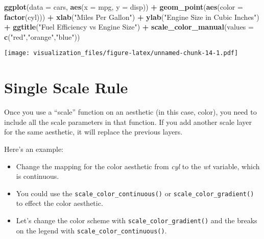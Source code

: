 \documentclass[oneside]{memoir}
\newenvironment{Shaded}{\begin{snugshade}}{\end{snugshade}}
\newcommand{\KeywordTok}[1]{\textcolor[rgb]{0.13,0.29,0.53}{\textbf{#1}}}
\newcommand{\DataTypeTok}[1]{\textcolor[rgb]{0.13,0.29,0.53}{#1}}
\newcommand{\StringTok}[1]{\textcolor[rgb]{0.31,0.60,0.02}{#1}}
\newcommand{\OperatorTok}[1]{\textcolor[rgb]{0.81,0.36,0.00}{\textbf{#1}}}
\newcommand{\NormalTok}[1]{#1}
\theoremstyle{definition}
\theoremstyle{definition}
\theoremstyle{definition}
\theoremstyle{remark}
\begin{document}
\begin{Shaded}
\begin{Highlighting}[]
\KeywordTok{ggplot}\NormalTok{(}\DataTypeTok{data =}\NormalTok{ cars, }\KeywordTok{aes}\NormalTok{(}\DataTypeTok{x =}\NormalTok{ mpg, }\DataTypeTok{y =}\NormalTok{ disp)) }\OperatorTok{+}
\StringTok{  }\KeywordTok{geom_point}\NormalTok{(}\KeywordTok{aes}\NormalTok{(}\DataTypeTok{color =} \KeywordTok{factor}\NormalTok{(cyl))) }\OperatorTok{+}
\StringTok{  }\KeywordTok{xlab}\NormalTok{(}\StringTok{"Miles Per Gallon"}\NormalTok{) }\OperatorTok{+}
\StringTok{  }\KeywordTok{ylab}\NormalTok{(}\StringTok{"Engine Size in Cubic Inches"}\NormalTok{) }\OperatorTok{+}
\StringTok{  }\KeywordTok{ggtitle}\NormalTok{(}\StringTok{"Fuel Efficiency vs Engine Size"}\NormalTok{) }\OperatorTok{+}
\StringTok{  }\KeywordTok{scale_color_manual}\NormalTok{(}\DataTypeTok{values =} \KeywordTok{c}\NormalTok{(}\StringTok{"red"}\NormalTok{,}\StringTok{"orange"}\NormalTok{,}\StringTok{"blue"}\NormalTok{))}
\end{Highlighting}
\end{Shaded}

\texttt{[image: visualization\_files/figure-latex/unnamed-chunk-14-1.pdf]}

\section{Single Scale Rule}\label{single-scale-rule}

Once you use a ``scale'' function on an aesthetic (in this case, color),
you need to include all the scale parameters in that function. If you
add another scale layer for the same aesthetic, it will replace the
previous layers.

Here's an example:

\begin{itemize}
\item
  Change the mapping for the color aesthetic from \emph{cyl} to the
  \emph{wt} variable, which is continuous.
\item
  You could use the \texttt{scale\_color\_continuous()} or
  \texttt{scale\_color\_gradient()} to effect the color aesthetic.
\item
  Let's change the color scheme with \texttt{scale\_color\_gradient()}
  and the breaks on the legend with \texttt{scale\_color\_continuous()}.
\end{itemize}
\end{document}
